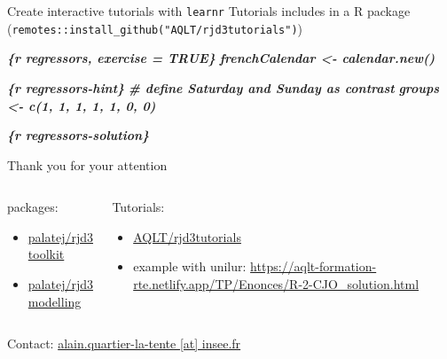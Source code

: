 \documentclass[10pt,xcolor=table,color={dvipsnames,usenames},ignorenonframetext,usepdftitle=false,french]{beamer}
\newenvironment{Shaded}{\begin{snugshade}}{\end{snugshade}}
\newcommand{\InformationTok}[1]{\textcolor[rgb]{0.56,0.35,0.01}{\textbf{\textit{#1}}}}
\begin{document}
\begin{frame}{Create interactive tutorials
with \texttt{learnr}}
\protect\hypertarget{create-interactive-tutorials-with-learnr}{}
Tutorials includes in a R package
(\texttt{remotes::install\_github("AQLT/rjd3tutorials")})

\begin{Shaded}
\begin{Highlighting}[]
\InformationTok{\textasciigrave{}\textasciigrave{}\textasciigrave{}\{r regressors, exercise = TRUE\}}
\InformationTok{frenchCalendar \textless{}{-} calendar.new()}
\InformationTok{\textasciigrave{}\textasciigrave{}\textasciigrave{}}

\InformationTok{\textasciigrave{}\textasciigrave{}\textasciigrave{}\{r regressors{-}hint\}}
\InformationTok{\# define Saturday and Sunday as contrast}
\InformationTok{groups \textless{}{-} c(1, 1, 1, 1, 1, 0, 0)}
\InformationTok{\textasciigrave{}\textasciigrave{}\textasciigrave{}}

\InformationTok{\textasciigrave{}\textasciigrave{}\textasciigrave{}\{r regressors{-}solution\}}

\InformationTok{\textasciigrave{}\textasciigrave{}\textasciigrave{}}
\end{Highlighting}
\end{Shaded}

\end{frame}

\begin{frame}{Thank you for your attention}
\protect\hypertarget{thank-you-for-your-attention}{}
\begin{columns}
\begin{column}{0.4\textwidth}
 packages:
\begin{itemize}
\item \href{https://github.com/palatej/rjd3toolkit}{\faGithub{} palatej/rjd3toolkit}

\item \href{https://github.com/palatej/rjd3modelling}{\faGithub{} palatej/rjd3modelling}
\end{itemize}
\end{column}
\begin{column}{0.6\textwidth}
Tutorials:
\begin{itemize}
\item \href{https://github.com/AQLT/rjd3tutorials}{\faGithub{} AQLT/rjd3tutorials}

\item example with unilur: \href{https://aqlt-formation-rte.netlify.app/TP/Enonces/R-2-CJO_solution.html}{https://aqlt-formation-rte.netlify.app/TP/Enonces/R-2-CJO\_solution.html}
\end{itemize}
\end{column}
\end{columns}

\vfill

Contact:
\href{mailto:alain.quartier-la-tente@insee.fr}{\faEnvelope{} alain.quartier-la-tente [at] insee.fr}
\end{frame}
\end{document}
